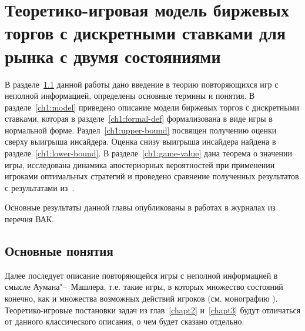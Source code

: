 \chapter{Теоретико-игровая модель биржевых торгов с дискретными ставками для рынка с
  двумя состояниями} \label{chapt1} 
{
\newcommand{\generalGame}[2]{%
G_{#1}^m\left({#2}\right)%
}
\newcommand{\infiniteGame}[1]{%
G_{\infty}^m\left({#1}\right)%
}
\newcommand{\firstPlayerPayoff}[4]{%
K_{#1}^m\left({#2}, {#3}, {#4}\right)%
}
\newcommand{\infiniteFirstPlayerPayoff}[3]{%
K_{\infty}^m\left({#1}, {#2}, {#3}\right)%
}
\newcommand{\gameValue}[2]{%
V_{#1}^m\left({#2}\right)%
}
\newcommand{\infiniteGameValue}[1]{%
V_{\infty}^m\left({#1}\right)%
}
\newcommand{\symm}[1]{%
\overline{#1}%
}
\newcommand{\symmGameExpression}[2][\infty]{%
G_{#1}^{m, \DCo}\left({#2}\right)%
}
\newcommand{\upperBound}[1]{%
H_{\infty}^m\left({#1}\right)%
}
\newcommand{\fGeneral}[2][1]{%
\sigma_{#1}^{#2}%
}
\newcommand{\pEven}[1][k]{%
p^0_{#1}%
}
\newcommand{\pOdd}[1][k]{%
p^{\beta}_{#1}%
}
\newcommand{\fEven}[1][k]{%
\phi^0_{#1}%
}
\newcommand{\fOdd}[1][k]{%
\phi^{\beta}_{#1}%
}
\newcommand{\fOpt}{\sigma^*}
\newcommand{\lowerBound}[2][\infty]{%
L_{#1}^m\left({#2}\right)%
}

В разделе~\ref{ch1:intro} данной работы дано введение в теорию повторяющихся игр
с неполной информацией, определены основные термины и понятия. В
разделе~\ref{ch1:model} приведено описание модели биржевых торгов с дискретными
ставками, которая в разделе~\ref{ch1:formal-def} формализована в виде игры в
нормальной форме. Раздел~\ref{ch1:upper-bound} посвящен получению оценки сверху
выигрыша инсайдера. Оценка снизу выигрыша инсайдера найдена в
разделе~\ref{ch1:lower-bound}. В разделе~\ref{ch1:game-value} дана теорема о
значении игры, исследована динамика апостериорных вероятностей при применении
игроками оптимальных стратегий и проведено сравнение полученных результатов с
результатами из~\cite{domansky07}.

Основные результаты данной главы опубликованы в работах
\cite{pyanykh14,pyanykh16:discr:ru} в журналах из перечня ВАК.

\section{Основные понятия}\label{ch1:intro}
Далее последует описание повторяющейся игры с неполной информацией в смысле
Аумана"--~Машлера, т.е. такие игры, в которых множество состояний конечно, как и
множества возможных действий игроков (см. монографию \cite{aumann95}).
Теоретико-игровые постановки задач из глав~\ref{chapt2} и~\ref{chapt3} будут
отличаться от данного классического описания, о чем будет сказано отдельно.

}
